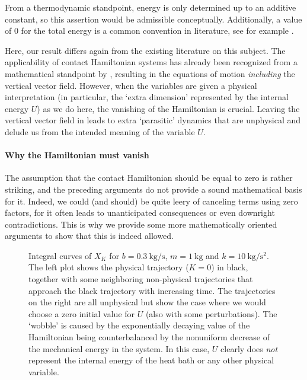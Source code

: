 From a thermodynamic standpoint, energy is only determined up to an additive constant, so this assertion would be admissible conceptually. Additionally, a value of 0 for the total energy is a common convention in literature, see for example \citet{Fermi1936}.

Here, our result differs again from the existing literature on this subject. The applicability of contact Hamiltonian systems has already been recognized from a mathematical standpoint by \citet{Bravetti2017}, resulting in the equations of motion \emph{including} the vertical vector field. However, when the variables are given a physical interpretation (in particular, the `extra dimension' represented by the internal energy \(U\)) as we do here, the vanishing of the Hamiltonian is crucial.
Leaving the vertical vector field in leads to extra `parasitic' dynamics that are unphysical and delude us from the intended meaning of the variable \(U\).

\paragraph{Why the Hamiltonian must vanish} The assumption that the contact Hamiltonian should be equal to zero is rather striking, and the preceding arguments do not provide a sound mathematical basis for it. Indeed, we could (and should) be quite leery of canceling terms using zero factors, for it often leads to unanticipated consequences or even downright contradictions. This is why we provide some more mathematically oriented arguments to show that this is indeed allowed.

\begin{figure}[ht!]
    \centering
    
    \caption{Integral curves of \(X_K\) for \(b = \SI{0.3}{\kilogram \per \second}\), \( m = \SI{1}{\kilogram}\) and  \(k = \SI{10}{\kilogram \per \second \squared}\). The left plot shows the physical trajectory (\(K = 0\)) in black, together with some neighboring non-physical trajectories that approach the black trajectory with increasing time. The trajectories on the right are all unphysical but show the case where we would choose a zero initial value for \(U\) (also with some perturbations). The `wobble' is caused by the exponentially decaying value of the Hamiltonian being counterbalanced by the nonuniform decrease of the mechanical energy in the system. In this case, \(U\) clearly does \emph{not} represent the internal energy of the heat bath or any other physical variable.}
    \label{fig:dho_trajectories}
\end{figure}

